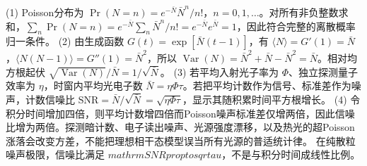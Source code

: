 (1) Poisson分布为 \(\Pr(N=n)=e^{-\bar N}\bar N^n/n!\)，\(n=0,1,\ldots\)。对所有非负整数求和，\(\sum_n\Pr(N=n)=e^{-\bar N}\sum_n\bar N^n/n!=e^{-\bar N}e^{\bar N}=1\)，因此符合完整的离散概率归一条件。
(2) 由生成函数 \(G(t)=\exp[\bar N(t-1)]\)，有 \(\langle N\rangle=G'(1)=\bar N\)，\(\langle N(N-1)\rangle=G''(1)=\bar N^2\)，所以 \(\operatorname{Var}(N)=\bar N^2+\bar N-\bar N^2=\bar N\)。相对均方根起伏 \(\sqrt{\operatorname{Var}(N)}/\bar N=1/\sqrt{\bar N}\)。
(3) 若平均入射光子率为 \(\Phi\)、独立探测量子效率为 \(\eta\)，时窗内平均光电子数 \(\bar N=\eta\Phi\tau\)。若把平均计数作为信号、标准差作为噪声，计数信噪比 \(\mathrm{SNR}=\bar N/\sqrt{\bar N}=\sqrt{\eta\Phi\tau}\)，显示其随积累时间平方根增长。
(4) 令积分时间增加四倍，则平均计数增四倍而Poisson噪声标准差仅增两倍，因此信噪比增为两倍。探测暗计数、电子读出噪声、光源强度漂移，以及热光的超Poisson涨落会改变方差，不能把理想相干态模型误当所有光源的普适统计律。 在纯散粒噪声极限，信噪比满足 \(mathrm{SNR}proptosqrt{	au}\)，不是与积分时间成线性比例。
